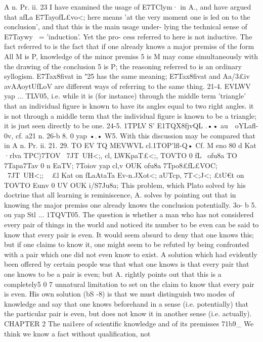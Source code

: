 {A n. Pr. ii. 23 I have examined the usage of E7TClym· in A., and have
argued that afLa E7TayofL£vo<; here means 'at the very moment one
is led on to the conclusion', and that this is the main usage under-
lying the technical sense of E7Taywy~ = 'induction'. Yet the pro-
cess referred to here is not inductive. The fact referred to is the
fact that if one already knows a major premiss of the form All
M is P, knowledge of the minor premiss 5 is M may come
simultaneously with the drawing of the conclusion 5 is P; the
reasoning referred to is an ordinary syllogism. E7Tax8fivat in "25
has the same meaning; E7Tax8fivat and Aa/3£iv avAAoytUfLoV are
different ways of referring to the same thing.
21-4. EVLWV yap ... TLV05, i.e. while it is (for instance) through
the middle term 'triangle' that an individual figure is known to
have its angles equal to two right angles. it is not through a
middle term that the individual figure is known to be a triangle;
it is just seen directly to be one.
24-5. 1TPLV S' E1TQX8fjvQL .•• au~~oYLafl-0v, cf. a21 n.
26-b 8. 0 yap •.• W5. With this discussion may be compared
that in A n. Pr. ii. 21.
29. TO EV TQ MEVWVL cl.1TOP'lfl-Q• Cf. M eno 80 d Kat ·rlva TPC)7TOV
~7JT~UH<;, cl, LWKpaT£<;, TOVTO 0 fL~ ofu8a TO 7Tapa7Tav 0 n EaT{V; 7Toiov
yap cl,v OUK ofu8a 7Tpo8£fL£VOC; ~7JT~UH<;; ~ £l Kat on fLaAtaTa Ev-n.JXot<;
aUTcp, 7T<;J<; £tU€t on TOVTO Eunv 0 UV OUK i/S7Ju8a; This problem,
which Plato solved by his doctrine that all learning is reminiscence,
A. solves by pointing out that in knowing the major premiss one
already knows the conclusion potentially.
3o- b 5. ou yap Stl ... 1TQVT05. The question is whether a man
who has not considered every pair of things in the world and
noticed its number to be even can be said to know that every pair
is even. It would seem absurd to deny that one knows this; but
if one claims to know it, one might seem to be refuted by being
confronted with a pair which one did not even know to exist.
A solution which had evidently been offered by certain people
was that what one knows is that every pair that one knows to be
a pair is even; but A. rightly points out that this is a completely5 0 7
unnatural limitation to set on the claim to know that every pair
is even. His own solution (bS -8) is that we must distinguish two
modes of knowledge and say that one knows beforehand in a
sense (i.e. potentially) that the particular pair is even, but does
not know it in another sense (i.e. actually).
CHAPTER 2
The nai1ere of scientific knowledge and of its premisses
71b9_ We think we know a fact without qualification, not
}}
